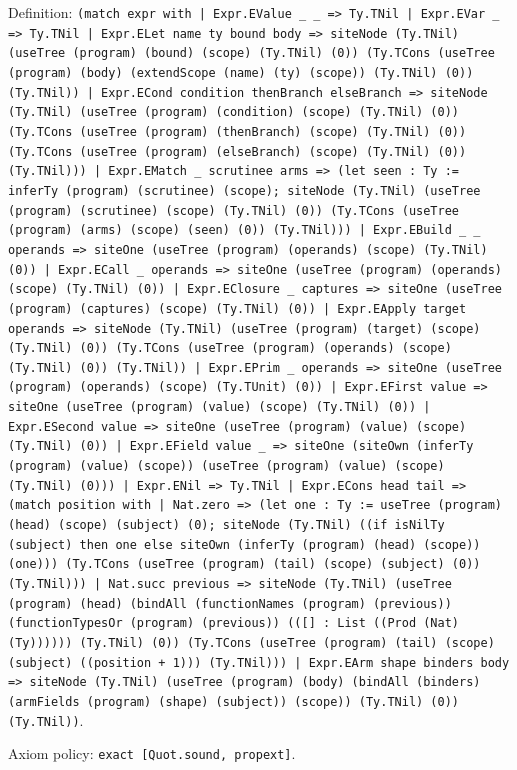 \documentclass[11pt]{article}
\begin{document}
\noindent Definition: \texttt{(match expr with | Expr.EValue \_ \_ => Ty.TNil | Expr.EVar \_ => Ty.TNil | Expr.ELet name ty bound body => siteNode (Ty.TNil) (useTree (program) (bound) (scope) (Ty.TNil) (0)) (Ty.TCons (useTree (program) (body) (extendScope (name) (ty) (scope)) (Ty.TNil) (0)) (Ty.TNil)) | Expr.ECond condition thenBranch elseBranch => siteNode (Ty.TNil) (useTree (program) (condition) (scope) (Ty.TNil) (0)) (Ty.TCons (useTree (program) (thenBranch) (scope) (Ty.TNil) (0)) (Ty.TCons (useTree (program) (elseBranch) (scope) (Ty.TNil) (0)) (Ty.TNil))) | Expr.EMatch \_ scrutinee arms => (let seen : Ty := inferTy (program) (scrutinee) (scope); siteNode (Ty.TNil) (useTree (program) (scrutinee) (scope) (Ty.TNil) (0)) (Ty.TCons (useTree (program) (arms) (scope) (seen) (0)) (Ty.TNil))) | Expr.EBuild \_ \_ operands => siteOne (useTree (program) (operands) (scope) (Ty.TNil) (0)) | Expr.ECall \_ operands => siteOne (useTree (program) (operands) (scope) (Ty.TNil) (0)) | Expr.EClosure \_ captures => siteOne (useTree (program) (captures) (scope) (Ty.TNil) (0)) | Expr.EApply target operands => siteNode (Ty.TNil) (useTree (program) (target) (scope) (Ty.TNil) (0)) (Ty.TCons (useTree (program) (operands) (scope) (Ty.TNil) (0)) (Ty.TNil)) | Expr.EPrim \_ operands => siteOne (useTree (program) (operands) (scope) (Ty.TUnit) (0)) | Expr.EFirst value => siteOne (useTree (program) (value) (scope) (Ty.TNil) (0)) | Expr.ESecond value => siteOne (useTree (program) (value) (scope) (Ty.TNil) (0)) | Expr.EField value \_ => siteOne (siteOwn (inferTy (program) (value) (scope)) (useTree (program) (value) (scope) (Ty.TNil) (0))) | Expr.ENil => Ty.TNil | Expr.ECons head tail => (match position with | Nat.zero => (let one : Ty := useTree (program) (head) (scope) (subject) (0); siteNode (Ty.TNil) ((if isNilTy (subject) then one else siteOwn (inferTy (program) (head) (scope)) (one))) (Ty.TCons (useTree (program) (tail) (scope) (subject) (0)) (Ty.TNil))) | Nat.succ previous => siteNode (Ty.TNil) (useTree (program) (head) (bindAll (functionNames (program) (previous)) (functionTypesOr (program) (previous)) (([] : List ((Prod (Nat) (Ty)))))) (Ty.TNil) (0)) (Ty.TCons (useTree (program) (tail) (scope) (subject) ((position + 1))) (Ty.TNil))) | Expr.EArm shape binders body => siteNode (Ty.TNil) (useTree (program) (body) (bindAll (binders) (armFields (program) (shape) (subject)) (scope)) (Ty.TNil) (0)) (Ty.TNil))}.\par
\noindent Axiom policy: \texttt{exact [Quot.sound, propext]}.\par
\end{document}
